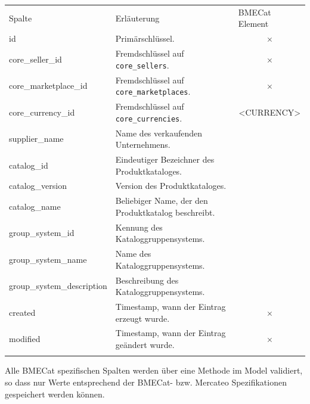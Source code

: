 	\begin{table}[!htbp]
		\begin{tabularx}{\textwidth \small}{p{4cm} X p{2.8cm} }
			\rowcolor[HTML]{EFEFEF} 
			Spalte & Erläuterung & BMECat Element \\ \cline{1-3} \addlinespace[7pt]
			id & Primärschlüssel. & \multicolumn{1}{c}{\normalsize$\times$} \\
			core\_seller\_id & Fremdschlüssel auf \texttt{core\_sellers}.  & \multicolumn{1}{c}{\normalsize$\times$}  \\ 
			core\_marketplace\_id & Fremdschlüssel auf \texttt{core\_marketplaces}. & \multicolumn{1}{c}{\normalsize$\times$} \\ 
			core\_currency\_id & Fremdschlüssel auf \texttt{core\_currencies}.  &\multicolumn{1}{c}{ \textless CURRENCY\textgreater} \\ 
			supplier\_name & Name des verkaufenden Unternehmens. & \multicolumn{1}{c}{\normalsize \checked}   \\
			catalog\_id & Eindeutiger Bezeichner des Produktkataloges. & \multicolumn{1}{c}{\normalsize \checked}  \\
			catalog\_version & Version des Produktkataloges. & \multicolumn{1}{c}{\normalsize \checked} \\
			catalog\_name & Beliebiger Name, der den Produktkatalog beschreibt. & \multicolumn{1}{c}{\normalsize \checked} \\
			group\_system\_id & Kennung des Kataloggruppensystems. & \multicolumn{1}{c}{\normalsize \checked}  \\
			group\_system\_name & Name des Kataloggruppensystems. & \multicolumn{1}{c}{\normalsize \checked}  \\
			group\_system\_description & Beschreibung des Kataloggruppensystems. & \multicolumn{1}{c}{\normalsize \checked} \\	
			created & Timestamp, wann der Eintrag erzeugt wurde. & \multicolumn{1}{c}{\normalsize$\times$} \\
			modified & Timestamp, wann der Eintrag geändert wurde. & \multicolumn{1}{c}{\normalsize$\times$}\\\addlinespace[7pt] \cline{1-3} 
		\end{tabularx}%
	\end{table}
	Alle BMECat spezifischen Spalten werden über eine Methode im Model validiert, so dass nur Werte entsprechend der BMECat- bzw. Mercateo Spezifikationen gespeichert werden können.
	 
